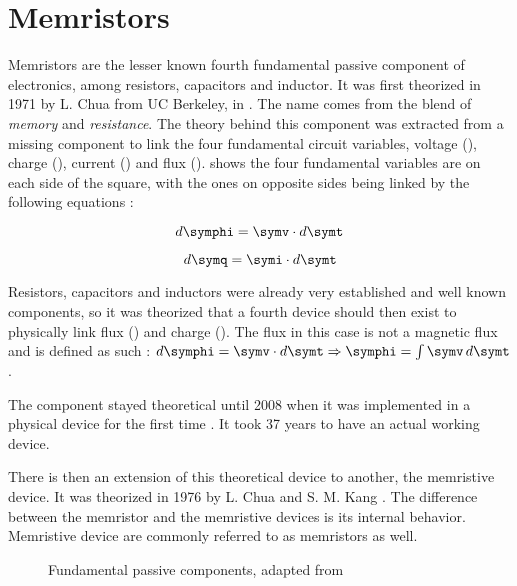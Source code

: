 \section{Memristors}
\label{sec:memristors}

Memristors are the lesser known fourth fundamental passive component of electronics, among resistors, capacitors and inductor.
It was first theorized in 1971 by L. Chua from UC Berkeley, in \cite{TheoMemristor}. The name comes from the blend of \textit{memory} and \textit{resistance}.
The theory behind this component was extracted from a missing component to link the four fundamental circuit variables, voltage (\symv), charge (\symq), current (\symq) and flux (\symphi).  shows the four fundamental variables are on each side of the square, with the ones on opposite sides being linked by the following equations :

\begin{equation}
  d\symphi = \symv\cdot d\symt
\end{equation}

\begin{equation}
  d\symq = \symi\cdot d\symt
\end{equation}

Resistors, capacitors and inductors were already very established and well known components, so it was theorized that a fourth device should then exist to physically link flux (\symphi) and charge (\symq).  The flux in this case is not a magnetic flux and is defined as such : $d\symphi=\symv\cdot d\symt \Rightarrow \symphi =  \int \symv \,d\symt$.

The component stayed theoretical until 2008 when it was implemented in a physical device for the first time \cite{memristorFab}. It took 37 years to have an actual working device.

There is then an extension of this theoretical device to another, the memristive device. It was theorized in 1976 by L. Chua and S. M. Kang \cite{memrestiveDev}. The difference between the memristor and the memristive devices is its internal behavior. Memristive device are commonly referred to as memristors as well.

\begin{figure}[H]
  \centering
  
  \caption{Fundamental passive components, adapted from \cite{memWiki}}
  \label{fig:fundComp}
\end{figure}

